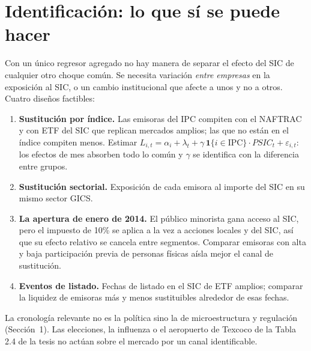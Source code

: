 \documentclass[11pt,letterpaper]{article}
\theoremstyle{definition}
\theoremstyle{plain}
\newcommand{\PSIC}{\mathit{PSIC}}
\begin{document}
\section{Identificación: lo que sí se puede hacer}
Con un único regresor agregado no hay manera de separar el efecto del SIC de cualquier otro choque común. Se necesita variación \emph{entre empresas} en la exposición al SIC, o un cambio institucional que afecte a unos y no a otros. Cuatro diseños factibles:
\begin{enumerate}
\item \textbf{Sustitución por índice.} Las emisoras del IPC compiten con el NAFTRAC y con ETF del SIC que replican mercados amplios; las que no están en el índice compiten menos. Estimar $L_{i,t}=\alpha_i+\lambda_t+\gamma\,\mathbf 1\{i\in\mathrm{IPC}\}\cdot\PSIC_t+\varepsilon_{i,t}$: los efectos de mes absorben todo lo común y $\gamma$ se identifica con la diferencia entre grupos.
\item \textbf{Sustitución sectorial.} Exposición de cada emisora al importe del SIC en su mismo sector GICS.
\item \textbf{La apertura de enero de 2014.} El público minorista gana acceso al SIC, pero el impuesto de 10\% se aplica a la vez a acciones locales y del SIC, así que su efecto relativo se cancela entre segmentos. Comparar emisoras con alta y baja participación previa de personas físicas aísla mejor el canal de sustitución.
\item \textbf{Eventos de listado.} Fechas de listado en el SIC de ETF amplios; comparar la liquidez de emisoras más y menos sustituibles alrededor de esas fechas.
\end{enumerate}
La cronología relevante no es la política sino la de microestructura y regulación (Sección~1). Las elecciones, la influenza o el aeropuerto de Texcoco de la Tabla 2.4 de la tesis no actúan sobre el mercado por un canal identificable.

\end{document}
